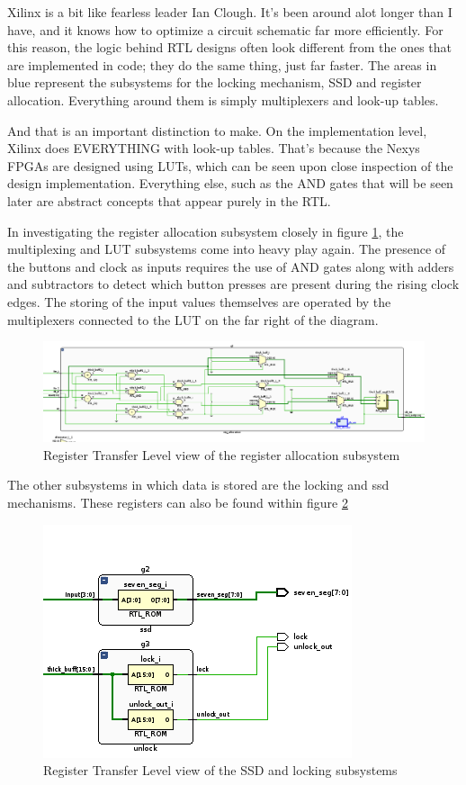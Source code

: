 \documentclass[12pt,a4paper]{article}
\begin{document}
Xilinx is a bit like fearless leader Ian Clough. It's been around alot longer than I have, and it knows how to optimize a circuit schematic far more efficiently. For this reason, the logic behind RTL designs often look different from the ones that are implemented in code; they do the same thing, just far faster. The areas in blue represent the subsystems for the locking mechanism, SSD and register allocation. Everything around them is simply multiplexers and look-up tables.

And that is an important distinction to make. On the implementation level, Xilinx does EVERYTHING with look-up tables. That's because the Nexys FPGAs are designed using LUTs, which can be seen upon close inspection of the design implementation. Everything else, such as the AND gates that will be seen later are abstract concepts that appear purely in the RTL.

In investigating the register allocation subsystem closely in figure \ref{fig:reg_all_close}, the multiplexing and LUT subsystems come into heavy play again. The presence of the buttons and clock as inputs requires the use of AND gates along with adders and subtractors to detect which button presses are present during the rising clock edges. The storing of the input values themselves are operated by the multiplexers connected to the LUT on the far right of the diagram.

\begin{figure}[H]
    \centering
    \includegraphics[scale=0.25]{images/reg_all_close.png}
    \caption{Register Transfer Level view of the register allocation subsystem}
    \label{fig:reg_all_close}
\end{figure}

The other subsystems in which data is stored are the locking and ssd mechanisms. These registers can also be found within figure \ref{fig:others_close}

\begin{figure}[H]
    \centering
    \includegraphics[scale=0.25]{images/others_close.png}
    \caption{Register Transfer Level view of the SSD and locking subsystems}
    \label{fig:others_close}
\end{figure}
\end{document}
